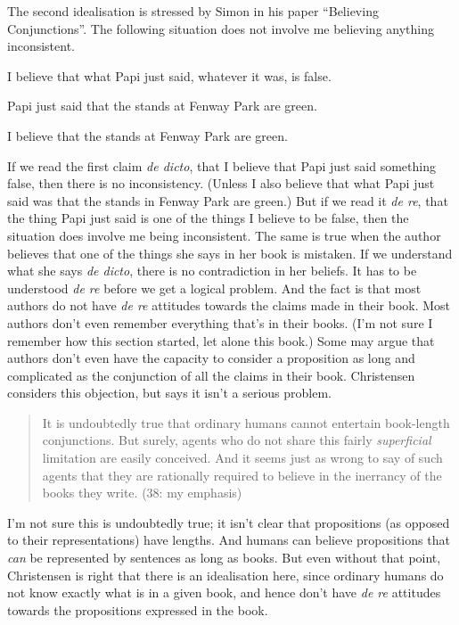 The second idealisation is stressed by Simon \citeauthor{Evnine1999} in his paper ``Believing Conjunctions''. The following situation does not involve me believing anything inconsistent. 

\begin{itemize*}
\item I believe that what Papi just said, whatever it was, is false. 
\item Papi just said that the stands at Fenway Park are green. 
\item I believe that the stands at Fenway Park are green. 
\end{itemize*}

\noindent If we read the first claim \textit{de dicto}, that I believe that Papi just said something false, then there is no inconsistency. (Unless I also believe that what Papi just said was that the stands in Fenway Park are green.) But if we read it \textit{de re}, that the thing Papi just said is one of the things I believe to be false, then the situation does involve me being inconsistent. The same is true when the author believes that one of the things she says in her book is mistaken. If we understand what she says \textit{de dicto}, there is no contradiction in her beliefs. It has to be understood \textit{de re} before we get a logical problem. And the fact is that most authors do not have \textit{de re} attitudes towards the claims made in their book. Most authors don't even remember everything that's in their books. (I'm not sure I remember how this section started, let alone this book.) Some may argue that authors don't even have the capacity to consider a proposition as long and complicated as the conjunction of all the claims in their book. Christensen considers this objection, but says it isn't a serious problem.

\begin{quote}
It is undoubtedly true that ordinary humans cannot entertain book-length conjunctions. But surely, agents who do not share this fairly \textit{superficial} limitation are easily conceived. And it seems just as wrong to say of such agents that they are rationally required to believe in the inerrancy of the books they write. (38: my emphasis)
\end{quote}

\noindent I'm not sure this is undoubtedly true; it isn't clear that propositions (as opposed to their representations) have lengths. And humans can believe propositions that \textit{can} be represented by sentences as long as books. But even without that point, Christensen is right that there is an idealisation here, since ordinary humans do not know exactly what is in a given book, and hence don't have \textit{de re} attitudes towards the propositions expressed in the book.

